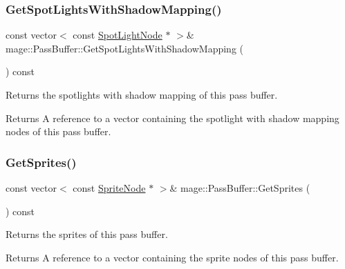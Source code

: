 \subsubsection{\texorpdfstring{Get\+Spot\+Lights\+With\+Shadow\+Mapping()}{GetSpotLightsWithShadowMapping()}}
{\footnotesize\ttfamily const vector$<$ const \hyperlink{namespacemage_aeed5dee4ff6c591eabb0e9114256df4a}{Spot\+Light\+Node} $\ast$ $>$\& mage\+::\+Pass\+Buffer\+::\+Get\+Spot\+Lights\+With\+Shadow\+Mapping (\begin{DoxyParamCaption}{ }\end{DoxyParamCaption}) const\hspace{0.3cm}{\ttfamily [noexcept]}}

Returns the spotlights with shadow mapping of this pass buffer.

\begin{DoxyReturn}{Returns}
A reference to a vector containing the spotlight with shadow mapping nodes of this pass buffer. 
\end{DoxyReturn}
\hypertarget{structmage_1_1_pass_buffer_a0ac14b71c0af69e946a37b4c2873d783}{}\label{structmage_1_1_pass_buffer_a0ac14b71c0af69e946a37b4c2873d783} 
\subsubsection{\texorpdfstring{Get\+Sprites()}{GetSprites()}}
{\footnotesize\ttfamily const vector$<$ const \hyperlink{classmage_1_1_sprite_node}{Sprite\+Node} $\ast$ $>$\& mage\+::\+Pass\+Buffer\+::\+Get\+Sprites (\begin{DoxyParamCaption}{ }\end{DoxyParamCaption}) const\hspace{0.3cm}{\ttfamily [noexcept]}}

Returns the sprites of this pass buffer.

\begin{DoxyReturn}{Returns}
A reference to a vector containing the sprite nodes of this pass buffer. 
\end{DoxyReturn}
\hypertarget{structmage_1_1_pass_buffer_a8d21b9d7a68d56c5833f814ce0b6b0db}{}\label{structmage_1_1_pass_buffer_a8d21b9d7a68d56c5833f814ce0b6b0db} 
